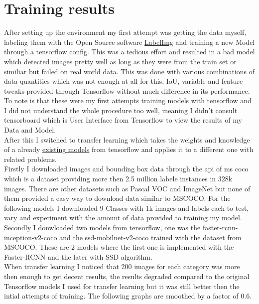 \section{Training results}
After setting up the environment my first attempt was getting the data myself, labeling them with the Open Source software
\href{https://github.com/tzutalin/labelImg}{LabelImg} and training a new Model through a tensorflow config. This was a tedious effort and
resulted in a bad model which detected images pretty well as long as they were from the train set or similiar but failed on real world data.
This was done with various combinations of data quantities which was not enough at all for this, IoU, variable and feature tweaks provided
through Tensorflow without much difference in its performance. To note is that these were my first attempts training models with tensorflow
and I did not understand the whole procedure too well, meaning I didn't consult tensorboard which is User Interface from Tensorflow to view
the results of my Data and Model. \\ 
After this I switched to transfer learning which takes the weights and knowledge of a already
\href{https://github.com/tensorflow/models/blob/master/research/object_detection/g3doc/detection_model_zoo.md}{existing models} from
tensorflow and applies it to a different one with related problems. \\ 
Firstly I downloaded images and bounding box data through the api of ms coco which is a dataset providing more then 2.5 million labele
instances in 328k images.\cite{mscoco} There are other datasets such as Pascal VOC and ImageNet but none of them provided a easy way to
download data similar to MSCOCO. For the following models I downloaded 9 Classes with 1k images and labels each to test, vary and experiment
with the amount of data provided to training my model. \\
Secondly I donwloaded two models from tensorflow, one was the faster-rcnn-inception-v2-coco and the ssd-mobilnet-v2-coco trained with the
dataset from MSCOCO. These are 2 models where the first one is implemented with the Faster-RCNN and the later with SSD algorithm. \\
When transfer learning I noticed that 200 images for each category was more then enough to get decent results, the results degraded compared
to the original Tensorflow models I used for transfer learning but it was still better then the intial attempts of training. The following
graphs are smoothed by a factor of 0.6. \\ \\

